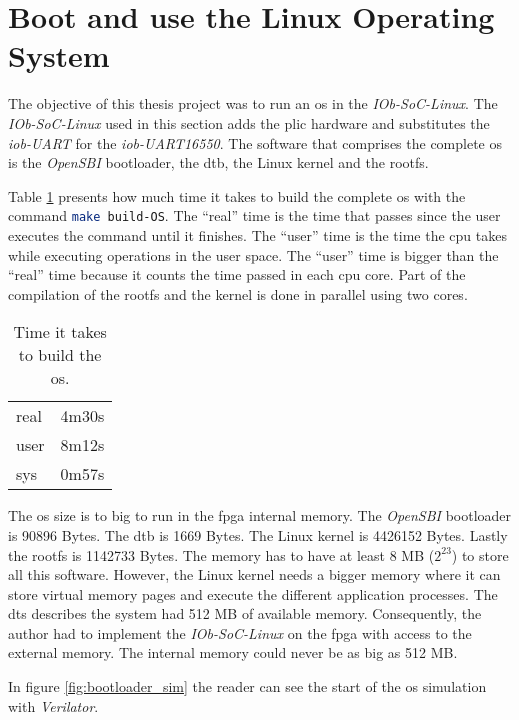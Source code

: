 \section{Boot and use the Linux Operating System}
\label{section:boot_linux}
The objective of this thesis project was to run an \acrlong{os} in the \textit{IOb-SoC-Linux}. The \textit{IOb-SoC-Linux} used in this section adds the \acrshort{plic} hardware and substitutes the \textit{iob-UART} for the \textit{iob-UART16550}. The software that comprises the complete \acrshort{os} is the \textit{OpenSBI} bootloader, the \acrlong{dtb}, the Linux kernel and the \acrlong{rootfs}.

Table \ref{tab:time_os} presents how much time it takes to build the complete \acrshort{os} with the command \lstinline[language=sh]{make build-OS}. The \enquote{real} time is the time that passes since the user executes the command until it finishes. The \enquote{user} time is the time the \acrshort{cpu} takes while executing operations in the user space. The \enquote{user} time is bigger than the \enquote{real} time because it counts the time passed in each \acrshort{cpu} core. Part of the compilation of the \acrshort{rootfs} and the kernel is done in parallel using two cores.

\begin{table}[!ht]
    \centering
    \begin{tabular}{ll}
    real & 4m30s \\
    user & 8m12s \\
    sys  & 0m57s
    \end{tabular}
    \caption{Time it takes to build the \acrshort{os}.}
    \label{tab:time_os}
\end{table}

The \acrshort{os} size is to big to run in the \acrshort{fpga} internal memory. The \textit{OpenSBI} bootloader is 90896 Bytes. The \acrlong{dtb} is 1669 Bytes. The Linux kernel is 4426152 Bytes. Lastly the \acrlong{rootfs} is 1142733 Bytes. The memory has to have at least 8 MB ($2^23$) to store all this software. However, the Linux kernel needs a bigger memory where it can store virtual memory pages and execute the different application processes. The \acrlong{dts} describes the system had 512 MB of available memory. Consequently, the author had to implement the \textit{IOb-SoC-Linux} on the \acrshort{fpga} with access to the external memory. The internal memory could never be as big as 512 MB.

In figure \ref{fig:bootloader_sim} the reader can see the start of the \acrshort{os} simulation with \textit{Verilator}.

